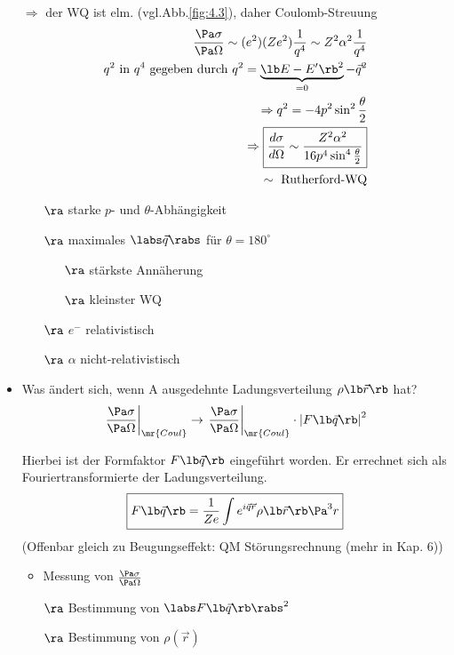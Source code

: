 \begin{itemize}
$\Rightarrow$ der WQ ist elm. (vgl.Abb.\ref{fig:4.3}), daher Coulomb-Streuung
\begin{align}
\begin{split}
\frac{\Pa \sigma}{\Pa \Omega}\sim (e^2)(Ze^2)\frac{1}{q^4}\sim Z^2\alpha^2\frac{1}{q^4}\\
q^2 \text{ in } q^4 \text{ gegeben durch } q^2=\underbrace{\lb E-E^\prime \rb ^2}_{=0}-\vec{q}^2\\
\Rightarrow q^2=-4p^2\sin^2\frac{\theta}{2}\\
\Rightarrow \boxed{\frac{d\sigma}{d\Omega}\sim \frac{Z^2\alpha^2}{16p^4 \sin^4 \frac{\theta}{2}}}\\
\sim\text{ Rutherford-WQ}
\end{split}
\end{align}
\begin{itemize}
\item[$\ra$] starke $p$- und $\theta$-Abhängigkeit
\item[$\ra$]  maximales $\labs \vec{q} \rabs$ für $\theta=180^{\circ}$
\begin{itemize}
\item[$\ra$]  stärkste Annäherung
\item[$\ra$]  kleinster WQ
\end{itemize}
\item[$\ra$]  $e^-$ relativistisch
\item[$\ra$]  $\alpha$ nicht-relativistisch
\end{itemize}

\item Was ändert sich, wenn A ausgedehnte Ladungsverteilung $\rho\lb \vec{r}\rb $ hat?
\begin{align}
\left. \frac{\Pa \sigma}{\Pa \Omega}\right|_\mr{Coul}\rightarrow \left. \frac{\Pa \sigma}{\Pa \Omega}\right|_\mr{Coul}\cdot \left|F\lb \vec{q}\rb \right|^2
\end{align}

Hierbei ist der Formfaktor $F\lb \vec{q}\rb $ eingeführt worden. Er errechnet sich als Fouriertransformierte der Ladungsverteilung.
\begin{align}
\boxed{F\lb \vec{q}\rb =\frac{1}{Ze}\int e^{i\vec{q}\vec{r}}\rho \lb \vec{r}\rb  \Pa^3 r}
\end{align}
(Offenbar gleich zu Beugungseffekt: QM Störungsrechnung (mehr in Kap. 6))
\begin{itemize}
\item Messung von $\frac{\Pa \sigma}{\Pa \Omega}$
\item[$\ra$] Bestimmung von $\labs F\lb \vec{q}\rb  \rabs ^2$
\item[$\ra$] Bestimmung von $\rho(\vec{r})$
\end{itemize}


\end{itemize}
